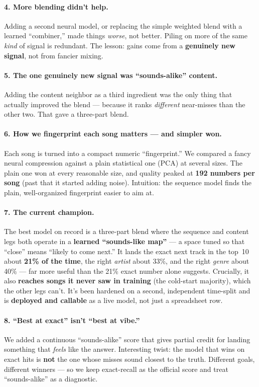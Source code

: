 \documentclass[11pt]{article}
\begin{document}
\paragraph{4. More blending didn't help.}
Adding a second neural model, or replacing the simple weighted blend with a
learned ``combiner,'' made things \emph{worse}, not better. Piling on more of the
same \emph{kind} of signal is redundant. The lesson: gains come from a
\textbf{genuinely new signal}, not from fancier mixing.

\paragraph{5. The one genuinely new signal was ``sounds-alike'' content.}
Adding the content neighbor as a third ingredient was the only thing that
actually improved the blend --- because it ranks \emph{different} near-misses
than the other two. That gave a three-part blend.

\paragraph{6. How we fingerprint each song matters --- and simpler won.}
Each song is turned into a compact numeric ``fingerprint.'' We compared a fancy
neural compression against a plain statistical one (PCA) at several sizes. The
plain one won at every reasonable size, and quality peaked at \textbf{192 numbers
per song} (past that it started adding noise). Intuition: the sequence model
finds the plain, well-organized fingerprint easier to aim at.

\paragraph{7. The current champion.}
The best model on record is a three-part blend where the sequence and content
legs both operate in a \textbf{learned ``sounds-like map''} --- a space tuned so
that ``close'' means ``likely to come next.'' It lands the exact next track in
the top~10 about \textbf{21\% of the time}, the right \emph{artist} about 33\%,
and the right \emph{genre} about 40\% --- far more useful than the 21\% exact
number alone suggests. Crucially, it also \textbf{reaches songs it never saw in
training} (the cold-start majority), which the other legs can't. It's been
hardened on a second, independent time-split and is \textbf{deployed and callable}
as a live model, not just a spreadsheet row.

\paragraph{8. ``Best at exact'' isn't ``best at vibe.''}
We added a continuous ``sounds-alike'' score that gives partial credit for
landing something that \emph{feels} like the answer. Interesting twist: the model
that wins on exact hits is \textbf{not} the one whose misses sound closest to the
truth. Different goals, different winners --- so we keep exact-recall as the
official score and treat ``sounds-alike'' as a diagnostic.
\end{document}

